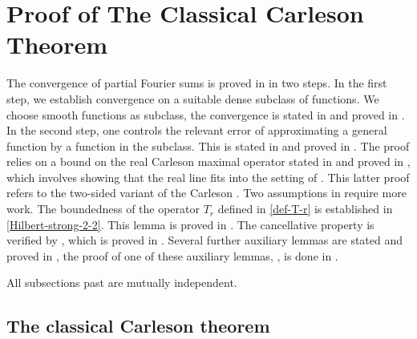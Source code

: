 \section{Proof of The Classical Carleson Theorem}

The convergence of partial Fourier sums is proved in
 in two steps. In the first step,
we establish convergence on a suitable dense subclass of functions. We choose smooth functions as subclass, the convergence is stated in  and proved in .
In the second step, one controls the relevant error of approximating a general function by a function in
the subclass. This is stated in  and proved
in .
The proof relies on a bound on the real Carleson maximal operator stated in  and proved in , which involves showing that the real line fits into the setting of .
This latter proof refers to the two-sided variant of the Carleson . Two assumptions in  require more work. The boundedness of the operator $T_r$ defined in \eqref{def-T-r} is established in \ref{Hilbert-strong-2-2}. This lemma is proved in .
The cancellative property is verified by , which is proved in .
Several further auxiliary lemmas are stated and proved in , the proof of one of these auxiliary lemmas, , is done in .

All subsections past  are mutually independent.



\subsection{The classical Carleson theorem}
\label{10classical}

